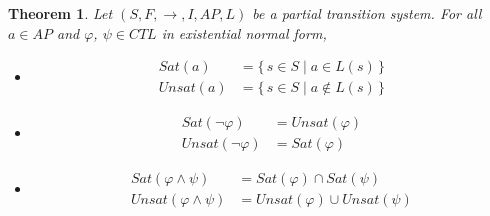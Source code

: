 \documentclass[12pt]{article}
\newcommand{\TRUE}{\mbox{\lstinline{true}}}
\newcommand{\FALSE}{\mbox{\lstinline{false}}}
\newtheorem{theorem}{Theorem}
\theoremstyle{definition}
\begin{document}
\begin{theorem}
Let $(S, F, \rightarrow, I, \mathit{AP}, L)$ be a partial transition system.  For all $a \in \mathit{AP}$ and $\varphi$, $\psi \in \mathit{CTL}$ in existential normal form,
\begin{itemize}
\item
\begin{align*}
\mathit{Sat}(a) & = \{\, s \in S \mid a \in L(s) \,\}\\
\mathit{Unsat}(a) & = \{\, s \in S \mid a \not\in L(s) \,\}
\end{align*}
\item
\begin{align*}
\mathit{Sat}(\neg \varphi) & = \mathit{Unsat}(\varphi)\\
\mathit{Unsat}(\neg \varphi) & = \mathit{Sat}(\varphi)
\end{align*}
\item
\begin{align*}
\mathit{Sat}(\varphi \wedge \psi) & = \mathit{Sat}(\varphi) \cap \mathit{Sat}(\psi)\\
\mathit{Unsat}(\varphi \wedge \psi) & = \mathit{Unsat}(\varphi) \cup \mathit{Unsat}(\psi)
\end{align*}

\end{itemize}
\end{theorem}
\end{document}
